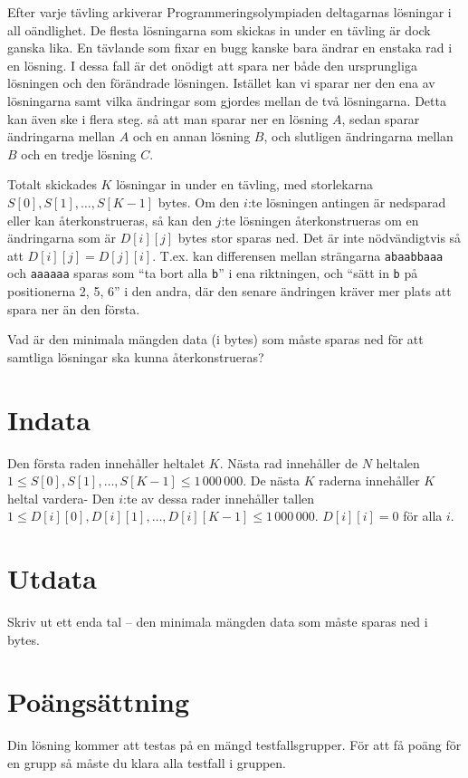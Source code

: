 Efter varje tävling arkiverar Programmeringsolympiaden deltagarnas lösningar i all oändlighet.
De flesta lösningarna som skickas in under en tävling är dock ganska lika.
En tävlande som fixar en bugg kanske bara ändrar en enstaka rad i en lösning.
I dessa fall är det onödigt att spara ner både den ursprungliga lösningen och den förändrade lösningen.
Istället kan vi sparar ner den ena av lösningarna samt vilka ändringar som gjordes mellan de två lösningarna.
Detta kan även ske i flera steg. så att man sparar ner en lösning $A$, sedan sparar ändringarna mellan $A$ och en annan lösning $B$, och slutligen ändringarna mellan $B$ och en tredje lösning $C$.

Totalt skickades $K$ lösningar in under en tävling, med storlekarna $S[0], S[1], \dots, S[K-1]$ bytes.
Om den $i$:te lösningen antingen är nedsparad eller kan återkonstrueras, så kan den $j$:te lösningen återkonstrueras om en ändringarna som är $D[i][j]$ bytes stor sparas ned.
Det är inte nödvändigtvis så att $D[i][j] = D[j][i]$.
T.ex. kan differensen mellan strängarna \texttt{abaabbaaa} och \texttt{aaaaaa} sparas som ``ta bort alla \texttt{b}'' i ena riktningen, och ``sätt in \texttt{b} på positionerna 2, 5, 6'' i den andra, där den senare ändringen kräver mer plats att spara ner än den första.

Vad är den minimala mängden data (i bytes) som måste sparas ned för att samtliga lösningar ska kunna återkonstrueras?

\section*{Indata}
Den första raden innehåller heltalet $K$.
Nästa rad innehåller de $N$ heltalen $1 \le S[0], S[1], \dots, S[K-1] \le 1\,000\,000$.
De nästa $K$ raderna innehåller $K$ heltal vardera-
Den $i$:te av dessa rader innehåller tallen $1 \le D[i][0], D[i][1], \dots, D[i][K-1] \le 1\,000\,000$.
$D[i][i] = 0$ för alla $i$.

\section*{Utdata}
Skriv ut ett enda tal -- den minimala mängden data som måste sparas ned i bytes.

\section*{Poängsättning}
Din lösning kommer att testas på en mängd testfallsgrupper. För att få poäng för en grupp
så måste du klara alla testfall i gruppen.

